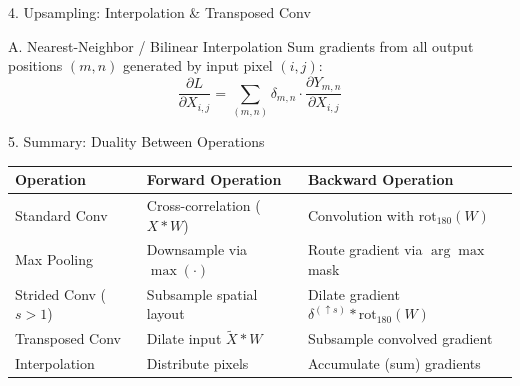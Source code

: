 \documentclass[aspectratio=169, 11pt]{beamer}
\newcommand{\nosrc}{}       %
\begin{document}
\begin{frame}{4. Upsampling: Interpolation \& Transposed Conv}
  \nosrc
  \begin{block}{A. Nearest-Neighbor / Bilinear Interpolation}
    Sum gradients from all output positions $(m,n)$ generated by input pixel $(i,j)$:
    $$\frac{\partial L}{\partial X_{i,j}} = \sum_{(m,n)} \delta_{m,n} \cdot \frac{\partial Y_{m,n}}{\partial X_{i,j}}$$
  \end{block}

  \vspace{0.2cm}
\end{frame}

\begin{frame}{5. Summary: Duality Between Operations}
  \nosrc
  \centering
  \begin{tabular}{lll}
    \toprule
    \textbf{Operation} & \textbf{Forward Operation} & \textbf{Backward Operation} \\
    \midrule
    Standard Conv & Cross-correlation ($X * W$) & Convolution with $\text{rot}_{180}(W)$ \\
    Max Pooling & Downsample via $\max(\cdot)$ & Route gradient via $\arg\max$ mask \\
    Strided Conv ($s>1$) & Subsample spatial layout & Dilate gradient $\delta^{(\uparrow s)} * \text{rot}_{180}(W)$ \\
    Transposed Conv & Dilate input $\tilde{X} * W$ & Subsample convolved gradient \\
    Interpolation & Distribute pixels & Accumulate (sum) gradients \\
    \bottomrule
  \end{tabular}
\end{frame}
\end{document}
